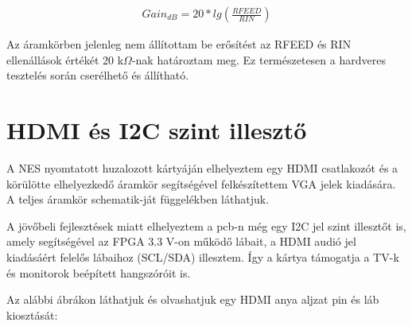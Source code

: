 	\begin{align}	
		Gain_{dB} = 20 * lg(\frac{RFEED}{RIN})
	\end{align}
 
	Az áramkörben jelenleg nem állítottam be erősítést az RFEED és RIN ellenállások értékét 20 k$\Omega$-nak határoztam meg. Ez természetesen a hardveres tesztelés során cserélhető és állítható.	
	
\section{HDMI és I2C szint illesztő}
	\label{sec:HMI-I2C}
	
	A NES nyomtatott huzalozott kártyáján elhelyeztem egy HDMI csatlakozót és a körülötte elhelyezkedő áramkör segítségével felkészítettem VGA jelek kiadására. A teljes áramkör schematik-ját  függelékben láthatjuk.
	
	A jövőbeli fejlesztések miatt elhelyeztem a pcb-n még egy I2C jel szint illesztőt is, amely segítségével az FPGA 3.3 V-on működő lábait, a HDMI audió jel kiadásáért felelős lábaihoz (SCL/SDA) illesztem. Így a kártya támogatja a TV-k és monitorok beépített hangszóróit is. 
	
	Az alábbi ábrákon láthatjuk és olvashatjuk egy HDMI anya aljzat pin és láb kiosztását:   
	
